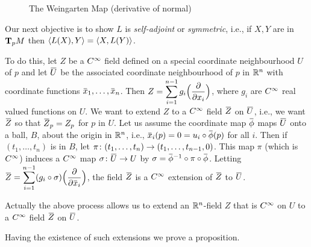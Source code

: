 \documentclass[../main]{subfiles}
\begin{document}
\begin{figure}[ht]
    \centering
    \caption{The Weingarten Map (derivative of normal)}
    \label{fig:the-weingarten-map-(derivative-of-normal)}
\end{figure}

Our next objective is to show $L$ is \emph{self-adjoint} or \emph{symmetric}, i.e., if $X,Y$ are in $\tangentspace{M}{p}$ then $\ip{L(X)}{Y}=\ip{X}{L(Y)}$.

To do this, let $Z$ be a $\CInfty$ field defined on a special coordinate neighbourhood $U$ of $p$ and let $\xoverline{U}$ be the associated coordinate neighbourhood of $p$ in $\bR^n$ with coordinate functions $\xoverline{x}_1,\dots,\xoverline{x}_n$. Then $Z=\displaystyle \sum_{i=1}^{n-1}g_i\Big(\pdv{}{ x_i}\Big)$, where $g_i$ are $\CInfty$ real valued functions on $U$. We want to extend $Z$ to a $\CInfty$ field $\xoverline{Z}$ on $\xoverline{U}$, i.e., we want $\xoverline{Z}$ so that $\xoverline{Z}_p=Z_p$ for $p$ in $U$. Let us assume the coordinate map $\xoverline{\phi}$ maps $\xoverline{U}$ onto a ball, $B$, about the origin in $\bR^n$, i.e., $\xoverline{x}_i(p)=0=u_i\circ\xoverline{\phi}(p)$ for all $i$. Then if $(t_1,\dots,t_n)$ is in $B$, let $\pi\colon (t_1,\dots,t_n)\functionMaps(t_1,\dots,t_{n-1},0)$. This map $\pi$ (which is $\CInfty$) induces a $\CInfty$ map $\sigma\colon\xoverline{U}\functionMaps U$ by $\sigma=\xoverline{\phi}^{-1}\circ\pi\circ\xoverline{\phi}$. Letting $\xoverline{Z}=\displaystyle\sum_{i=1}^{n-1}(g_i\circ\sigma)\Big(\pdv{}{\xoverline{x}_i}\Big)$, the field $\xoverline{Z}$ is a $\CInfty$ extension of $\xoverline{Z}$ to $\xoverline{U}$.

Actually the above process allows us to extend an $\bR^n$-field $Z$ that is $\CInfty$ on $U$ to a $\CInfty$ field $\xoverline{Z}$ on $\xoverline{U}$.

Having the existence of such extensions we prove a proposition.
\end{document}
